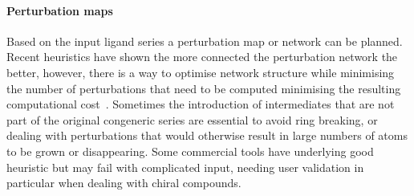 \documentclass[9pt,bestpractices]{livecoms}
\begin{document}
\paragraph{Perturbation maps}
Based on the input ligand series a perturbation map or network can be planned. Recent heuristics have shown the more connected the perturbation network the better, however, there is a way to optimise network structure while minimising the number of perturbations that need to be computed minimising the resulting computational cost~\cite{yang2019optimal}. Sometimes the introduction of intermediates that are not part of the original congeneric series are essential to avoid ring breaking, or dealing with perturbations that would otherwise result in large numbers of atoms to be grown or disappearing. Some commercial tools have underlying good heuristic but may fail with complicated input, needing user validation in particular when dealing with chiral compounds. 
\end{document}
